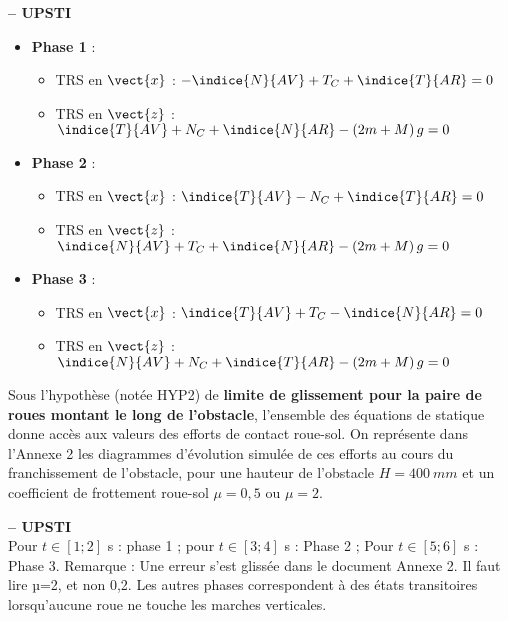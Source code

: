 \ifprof
\begin{corrige}\textbf{ -- UPSTI}\\ 
\begin{itemize}
\item \textbf{Phase 1} : 
\begin{itemize} 
\item TRS en $\vect{x}$ : $-\indice{N}{AV}+T_C+\indice{T}{AR}=0$
\item TRS en $\vect{z}$ : $\indice{T}{AV}+N_C+\indice{N}{AR}-\left(2m + M\right)g=0$
\end{itemize}
\item \textbf{Phase 2} : 
\begin{itemize} 
\item TRS en $\vect{x}$ : $\indice{T}{AV}-N_C+\indice{T}{AR}=0$
\item TRS en $\vect{z}$ : $\indice{N}{AV}+T_C+\indice{N}{AR}-\left(2m + M\right)g=0$
\end{itemize}
\item \textbf{Phase 3} : 
\begin{itemize} 
\item TRS en $\vect{x}$ : $\indice{T}{AV}+T_C-\indice{N}{AR}=0$
\item TRS en $\vect{z}$ : $\indice{N}{AV}+N_C+\indice{T}{AR}-\left(2m + M\right)g=0$
\end{itemize}
\end{itemize}
\end{corrige}
\else
\fi

\ifprof
\else
Sous l'hypothèse (notée HYP2) de \textbf{limite de glissement pour la paire de roues montant le long de l'obstacle}, l'ensemble des équations de statique donne accès aux valeurs des efforts de contact roue-sol. On représente dans l'Annexe 2 les diagrammes d'évolution simulée de ces efforts au cours du franchissement de l'obstacle, pour une hauteur de l'obstacle $H =\SI{400}{mm}$ et un coefficient de frottement roue-sol $\mu = 0,5$ ou $\mu = 2$.
\fi

\ifprof
\begin{corrige}\textbf{ -- UPSTI}\\ 
Pour $t\in [1;2]$ s : phase 1 ; pour $t\in [3;4]$ s :  Phase 2 ; Pour $t\in [5;6]$ s : Phase 3.
Remarque : Une erreur s’est glissée dans le document Annexe 2. Il faut lire µ=2, et non 0,2.
Les autres phases correspondent à des états transitoires lorsqu’aucune roue ne touche les marches verticales.
\end{corrige}
\else
\fi

